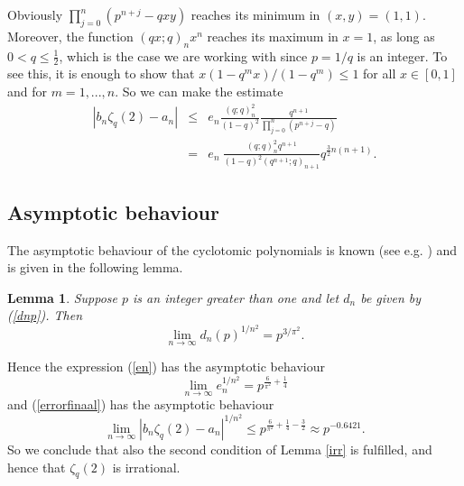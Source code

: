 \documentclass[12pt]{article}
\newtheorem{lemma}[theorem]{Lemma}
\numberwithin{equation}{section}
\begin{document}
Obviously $\prod_{j=0}^n(p^{n+j}-qxy)$
reaches its minimum in $(x,y)=(1,1)$.
Moreover, the function $(qx;q)_nx^n$ reaches its
maximum in $x=1$, as long as $0<q\leq\frac12$, which is the case
we are working with since $p=1/q$ is an integer. To see this,
it is enough to show that $x(1-q^mx)/(1-q^m)\leq 1$ for all $x\in[0,1]$
and for $m=1,...,n$. So we can make the
estimate
\begin{eqnarray}
 \nonumber \left|b_n\zeta_{q}(2)-a_n\right| &\leq& e_n\frac{(q;q)_n^2}{(1-q)^2}
\frac{q^{n+1}}{\prod_{j=0}^n(p^{n+j}-q)} \\
 \label{errorfinaal}  &=&e_n\ \frac{(q;q)_n^2q^{n+1}}{(1-q)^2(q^{n+1};q)_{n+1}}q^{\frac{3}{2}n(n+1)}.
\end{eqnarray}

\subsection{Asymptotic behaviour}

The asymptotic behaviour of the cyclotomic polynomials is known
(see e.g. \cite{lqlp}) and is given in the following lemma.
\begin{lemma}\label{dnasymp}
Suppose $p$ is an integer greater than one and let
$d_n$ be given by (\ref{dnp}).  Then
\[\lim_{n\rightarrow\infty}d_n(p)^{1/n^2}=p^{3/\pi^2}. \]
\end{lemma}

Hence the expression (\ref{en}) has the asymptotic behaviour
\begin{equation}\label{enasymp}
\lim_{n\rightarrow\infty} e_n^{1/n^2}=p^{\frac{6}{\pi^2}+\frac14}
\end{equation}
and (\ref{errorfinaal}) has the asymptotic behaviour
\begin{equation} \label{bnalspmacht}
\lim_{n\rightarrow\infty}\left|b_n\zeta_{q}(2)-a_n\right|^{1/n^2}\leq
p^{\frac{6}{\pi^2}+\frac14-\frac32}\approx p^{-0.6421}.
\end{equation}
So we conclude that also the second
condition of Lemma \ref{irr} is fulfilled, and hence that
$\zeta_{q}(2)$ is irrational.
\end{document}
